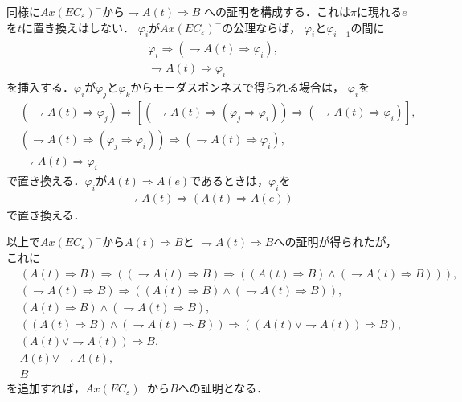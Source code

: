 	同様に$Ax(EC_{\varepsilon})^{-}$から$\rightharpoondown A(t) \Longrightarrow B$
	への証明を構成する．これは$\pi$に現れる$e$を$t$に置き換えはしない．
	$\varphi_{i}$が$Ax(EC_{\varepsilon})^{-}$の公理ならば，
	$\varphi_{i}$と$\varphi_{i+1}$の間に
	\begin{align}
		&\varphi_{i} \Longrightarrow (\rightharpoondown A(t) \Longrightarrow \varphi_{i}), \\
		&\rightharpoondown A(t) \Longrightarrow \varphi_{i}
	\end{align}
	を挿入する．$\varphi_{i}$が$\varphi_{j}$と$\varphi_{k}$からモーダスポンネスで得られる場合は，
	$\varphi_{i}$を
	\begin{align}
		&(\rightharpoondown A(t) \Longrightarrow \varphi_{j}) \Longrightarrow
		[(\rightharpoondown A(t) \Longrightarrow 
		(\varphi_{j}\Longrightarrow \varphi_{i}))
		\Longrightarrow (\rightharpoondown A(t) \Longrightarrow \varphi_{i})], \\
		&(\rightharpoondown A(t) \Longrightarrow 
		(\varphi_{j} \Longrightarrow \varphi_{i}))
		\Longrightarrow (\rightharpoondown A(t) \Longrightarrow \varphi_{i}), \\
		&\rightharpoondown A(t) \Longrightarrow \varphi_{i}
	\end{align}
	で置き換える．$\varphi_{i}$が$A(t) \Longrightarrow A(e)$であるときは，$\varphi_{i}$を
	\begin{align}
		\rightharpoondown A(t) \Longrightarrow (A(t) \Longrightarrow A(e))
	\end{align}
	で置き換える．
	
	以上で$Ax(EC_{\varepsilon})^{-}$から$A(t) \Longrightarrow B$と
	$\rightharpoondown A(t) \Longrightarrow B$への証明が得られたが，
	これに
	\begin{align}
		&(A(t) \Longrightarrow B) \Longrightarrow
		((\rightharpoondown A(t) \Longrightarrow B) \Longrightarrow
		((A(t) \Longrightarrow B) \wedge (\rightharpoondown A(t) \Longrightarrow B))), \\
		&(\rightharpoondown A(t) \Longrightarrow B) \Longrightarrow
		((A(t) \Longrightarrow B) \wedge (\rightharpoondown A(t) \Longrightarrow B)), \\
		&(A(t) \Longrightarrow B) \wedge (\rightharpoondown A(t) \Longrightarrow B), \\
		&((A(t) \Longrightarrow B) \wedge (\rightharpoondown A(t) \Longrightarrow B))
		\Longrightarrow ((A(t) \vee \rightharpoondown A(t)) \Longrightarrow B), \\
		&(A(t) \vee \rightharpoondown A(t)) \Longrightarrow B, \\
		&A(t) \vee \rightharpoondown A(t), \\
		&B
	\end{align}
	を追加すれば，$Ax(EC_{\varepsilon})^{-}$から$B$への証明となる．
	